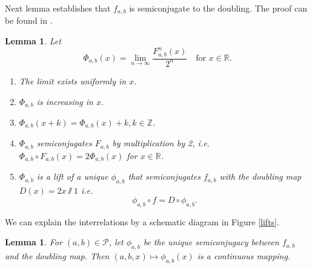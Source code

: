 \documentclass[12pt]{amsart}
\numberwithin{equation}{section}
\newtheorem{lemma}[theorem]{Lemma}
\theoremstyle{remark}
\begin{document}
\bigskip
Next lemma establishes that $f_{a,b}$ is semiconjugate to the doubling. The proof can be found  in \cite{MR}.
\begin{lemma}\label{Semiconj}
     Let 
\[
     \Phi_{a,b} (x)=\lim_{n \to \infty}\dfrac{F_{a,b}^n(x)}{2^n}\quad \text{for } x\in \mathbb R.
 \]
\begin{enumerate}
\item The limit exists uniformly in $x$.
\item $\Phi_{a,b} $ is increasing in $x$.
\item $\Phi_{a,b}(x+k)=\Phi_{a,b}(x) +k, k \in \mathbb{Z}$.
\item $\Phi_{a,b}$ semiconjugates $F_{a,b}$ by multiplication by 2, i.e.~$\Phi_{a,b}\circ F_{a,b}(x)=2\Phi_{a,b}(x)$ for $x\in \mathbb R$.
\item $\Phi_{a,b}$ is a lift of a unique $\phi_{a,b}$  that semiconjugates $f_{a,b}$ with the doubling map $D(x)=2x \sslash 1$ i.e.
\[ \phi_{a,b}\circ f=D \circ \phi_{a,b}. 
\]
\end{enumerate}

 
 \end{lemma}





We can explain the interrelations by a
schematic diagram in Figure \ref{lifts}. 



\begin{lemma}\label{cont semiconjugacy}
    For $(a, b)\in \mathcal{P}$, let $\phi_{a,b}$ be the unique semiconjugacy between $f_{a,b}$ and the doubling map. Then $(a,b,x) \mapsto \phi_{a,b}(x)$ is a continuous mapping.

\end{lemma}
\end{document}
